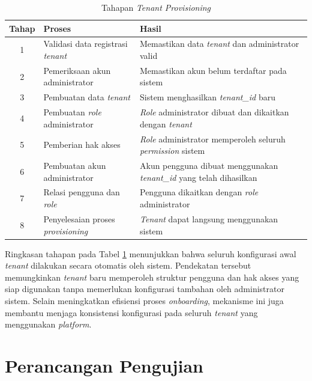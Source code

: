 \begin{table}[H]
  \centering
  \caption{Tahapan \textit{Tenant Provisioning}}
  \label{tab:tahapan_tenant_provisioning}
  \footnotesize
  \begin{tabular}{|c|p{5.5cm}|p{6cm}|}
    \hline
    \rowcolor[HTML]{EFEFEF}
    \textbf{Tahap} & \textbf{Proses} & \textbf{Hasil} \\
    \hline
    1 & Validasi data registrasi \textit{tenant} & Memastikan data \textit{tenant} dan administrator valid \\
    \hline
    2 & Pemeriksaan akun administrator & Memastikan akun belum terdaftar pada sistem \\
    \hline
    3 & Pembuatan data \textit{tenant} & Sistem menghasilkan \textit{tenant\_id} baru \\
    \hline
    4 & Pembuatan \textit{role} administrator & \textit{Role} administrator dibuat dan dikaitkan dengan \textit{tenant} \\
    \hline
    5 & Pemberian hak akses & \textit{Role} administrator memperoleh seluruh \textit{permission} sistem \\
    \hline
    6 & Pembuatan akun administrator & Akun pengguna dibuat menggunakan \textit{tenant\_id} yang telah dihasilkan \\
    \hline
    7 & Relasi pengguna dan \textit{role} & Pengguna dikaitkan dengan \textit{role} administrator \\
    \hline
    8 & Penyelesaian proses \textit{provisioning} & \textit{Tenant} dapat langsung menggunakan sistem \\
    \hline
  \end{tabular}
\end{table}

Ringkasan tahapan pada Tabel \ref{tab:tahapan_tenant_provisioning} menunjukkan bahwa seluruh konfigurasi awal \textit{tenant} dilakukan secara otomatis oleh sistem. Pendekatan tersebut memungkinkan \textit{tenant} baru memperoleh struktur pengguna dan hak akses yang siap digunakan tanpa memerlukan konfigurasi tambahan oleh administrator sistem. Selain meningkatkan efisiensi proses \textit{onboarding}, mekanisme ini juga membantu menjaga konsistensi konfigurasi pada seluruh \textit{tenant} yang menggunakan \textit{platform}.

\section{Perancangan Pengujian}

